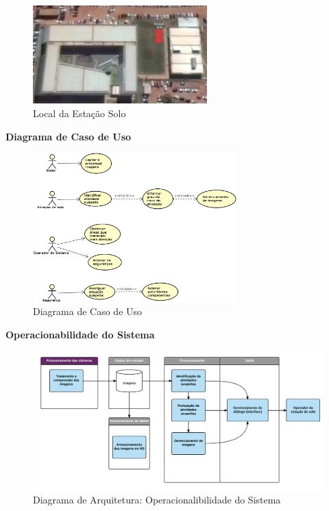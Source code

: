 \begin{figure}[H]
	\centering
	\includegraphics[width=0.6\textwidth]{figuras/estacaoSolo}
	\caption{Local da Estação Solo}
	\label{img:estacaoSoloLocal}
\end{figure}

\textbf{Diagrama de Caso de Uso}

\begin{figure}[H]
	\centering
	\includegraphics[width=0.7\textwidth]{figuras/Casosdeuso}
	\caption{Diagrama de Caso de Uso}
	\label{img:Casos de Uso}
\end{figure}

\textbf{Operacionabilidade do Sistema}

\begin{figure}[H]
	\centering
	\includegraphics[width=1\textwidth]{figuras/OperacionabilidadedoSistema}
	\caption{Diagrama de Arquitetura: Operacionalibilidade do Sistema}
	\label{img:Operacionabilidade do Sistema}
\end{figure}

